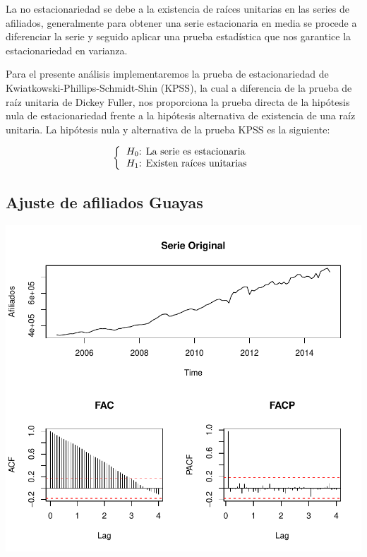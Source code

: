 \documentclass[11pt,a4paper,oneside]{article}\usepackage[]{graphicx}\usepackage[]{color}
\makeatletter
\def\maxwidth{ %
  \ifdim\Gin@nat@width>\linewidth
    \linewidth
  \else
    \Gin@nat@width
  \fi
}
\newenvironment{knitrout}{}{} %
\makeatother
\begin{document}
La no estacionariedad se debe a la existencia de raíces unitarias en las series de afiliados, generalmente para obtener una serie estacionaria en media se procede a diferenciar la serie y seguido aplicar una prueba estadística que nos garantice la estacionariedad en varianza.\newline

Para el presente análisis implementaremos la prueba de estacionariedad de Kwiatkowski-Phillips-Schmidt-Shin (KPSS), la cual a diferencia de la prueba de raíz unitaria de Dickey Fuller, nos proporciona la prueba directa de la hipótesis nula de estacionariedad frente a la hipótesis alternativa de existencia de una raíz unitaria. La hipótesis nula y alternativa de la prueba KPSS es la siguiente:

\[\left\{\begin{tabular}{l}$H_0$: La serie es estacionaria\\ $H_1$: Existen raíces unitarias  \end{tabular}\right.\]


\subsection{Ajuste de afiliados Guayas}

\begin{knitrout}
\color{fgcolor}

{\centering \includegraphics[width=\maxwidth]{figure/unnamed-chunk-2-1} 

}



\end{knitrout}
\end{document}
